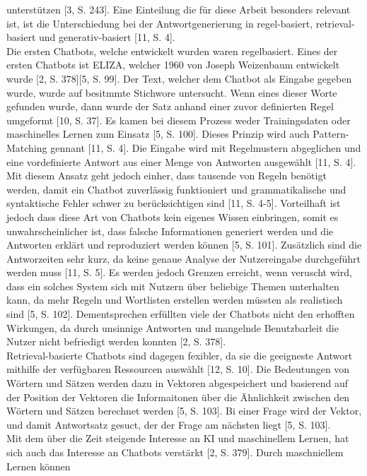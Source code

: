 unterstützen [3, S. 243]. Eine Einteilung die für diese Arbeit besonders relevant ist, ist die Unterschiedung bei der Antwortgenerierung in regel-basiert, 
retrieval-basiert und generativ-basiert [11, S. 4]. \\
Die ersten Chatbots, welche entwickelt wurden waren regelbasiert. Eines der ersten Chatbots ist ELIZA, welcher 1960 von Joseph Weizenbaum entwickelt wurde
[2, S. 378][5, S. 99]. Der Text, welcher dem Chatbot als Eingabe gegeben wurde, wurde auf besitmmte Stichwore untersucht. Wenn eines dieser Worte gefunden wurde, 
dann wurde der Satz anhand einer zuvor definierten Regel umgeformt [10, S. 37]. Es kamen bei diesem Prozess weder Trainingsdaten oder maschinelles Lernen zum 
Einsatz [5, S. 100]. Dieses Prinzip wird auch Pattern-Matching gennant [11, S. 4]. Die Eingabe wird mit Regelmustern abgeglichen und eine vordefinierte Antwort
aus einer Menge von Antworten ausgewählt [11, S. 4]. Mit diesem Ansatz geht jedoch einher, dass tausende von Regeln benötigt werden, damit ein Chatbot zuverlässig
funktioniert und grammatikalische und syntaktische Fehler schwer zu berücksichtigen sind [11, S. 4-5]. Vorteilhaft ist jedoch dass diese Art von Chatbots
kein eigenes Wissen einbringen, somit es unwahrscheinlicher ist, dass falsche Informationen generiert werden und die Antworten erklärt und reproduziert werden
können [5, S. 101]. Zusätzlich sind die Antworzeiten sehr kurz, da keine genaue Analyse der Nutzereingabe durchgeführt werden muss [11, S. 5]. Es werden jedoch 
Grenzen erreicht, wenn veruscht wird, dass ein solches System sich mit Nutzern über beliebige Themen unterhalten kann, da mehr Regeln und Wortlisten erstellen werden
müssten als realistisch sind [5, S. 102]. Dementsprechen erfüllten viele der Chatbots nicht den erhofften Wirkungen, da durch unsinnige Antworten und 
mangelnde Benutzbarleit die Nutzer nicht befriedigt werden konnten [2, S. 378]. \\
Retrieval-basierte Chatbots sind dagegen fexibler, da sie die geeigneste Antwort mithilfe der verfügbaren Ressourcen auswählt [12, S. 10]. Die Bedeutungen von 
Wörtern und Sätzen werden dazu in Vektoren abgespeichert und basierend auf der Position der Vektoren die Informaitonen über die Ähnlichkeit zwischen den 
Wörtern und Sätzen berechnet werden [5, S. 103]. Bi einer Frage wird der Vektor, und damit Antwortsatz gesuct, der der Frage am nächsten liegt [5, S. 103]. \\
Mit dem über die Zeit steigende Interesse an KI und maschinellem Lernen, hat sich auch das Interesse an Chatbots verstärkt [2, S. 379]. Durch maschniellem Lernen können

